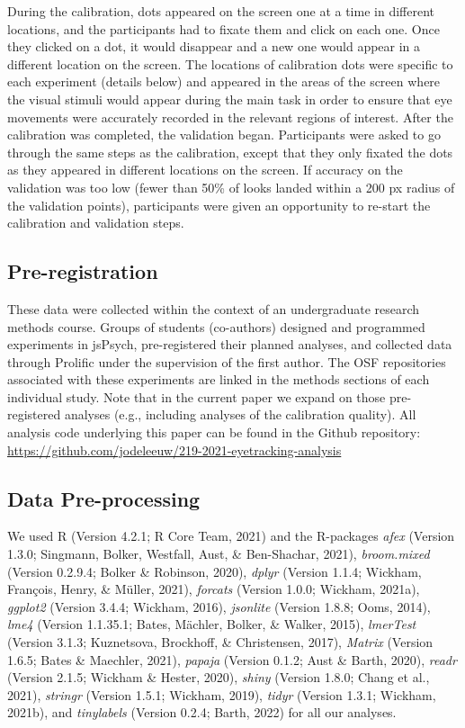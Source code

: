 \documentclass[
  man,floatsintext]{apa6}
\begin{document}
During the calibration, dots appeared on the screen one at a time in
different locations, and the participants had to fixate them and click
on each one. Once they clicked on a dot, it would disappear and a new
one would appear in a different location on the screen. The locations of
calibration dots were specific to each experiment (details below) and
appeared in the areas of the screen where the visual stimuli would
appear during the main task in order to ensure that eye movements were
accurately recorded in the relevant regions of interest. After the
calibration was completed, the validation began. Participants were asked
to go through the same steps as the calibration, except that they only
fixated the dots as they appeared in different locations on the screen.
If accuracy on the validation was too low (fewer than 50\% of looks
landed within a 200 px radius of the validation points),
participants were given an opportunity to re-start the calibration and
validation steps.

\subsection{Pre-registration}\label{pre-registration}

These data were collected within the context of an undergraduate research methods course. Groups of students (co-authors) designed and programmed experiments in jsPsych, pre-registered their planned analyses, and collected data through Prolific under the supervision of the first author. The OSF repositories associated with these experiments are linked in the methods sections of each individual study. Note that in the current paper we expand on those pre-registered analyses (e.g., including analyses of the calibration quality). All analysis code underlying this paper can be found in the Github repository: \url{https://github.com/jodeleeuw/219-2021-eyetracking-analysis}

\subsection{Data Pre-processing}\label{data-pre-processing}

We used R (Version 4.2.1; R Core Team, 2021) and the R-packages \emph{afex} (Version 1.3.0; Singmann, Bolker, Westfall, Aust, \& Ben-Shachar, 2021), \emph{broom.mixed} (Version 0.2.9.4; Bolker \& Robinson, 2020), \emph{dplyr} (Version 1.1.4; Wickham, François, Henry, \& Müller, 2021), \emph{forcats} (Version 1.0.0; Wickham, 2021a), \emph{ggplot2} (Version 3.4.4; Wickham, 2016), \emph{jsonlite} (Version 1.8.8; Ooms, 2014), \emph{lme4} (Version 1.1.35.1; Bates, Mächler, Bolker, \& Walker, 2015), \emph{lmerTest} (Version 3.1.3; Kuznetsova, Brockhoff, \& Christensen, 2017), \emph{Matrix} (Version 1.6.5; Bates \& Maechler, 2021), \emph{papaja} (Version 0.1.2; Aust \& Barth, 2020), \emph{readr} (Version 2.1.5; Wickham \& Hester, 2020), \emph{shiny} (Version 1.8.0; Chang et al., 2021), \emph{stringr} (Version 1.5.1; Wickham, 2019), \emph{tidyr} (Version 1.3.1; Wickham, 2021b), and \emph{tinylabels} (Version 0.2.4; Barth, 2022) for all our analyses.
\end{document}
